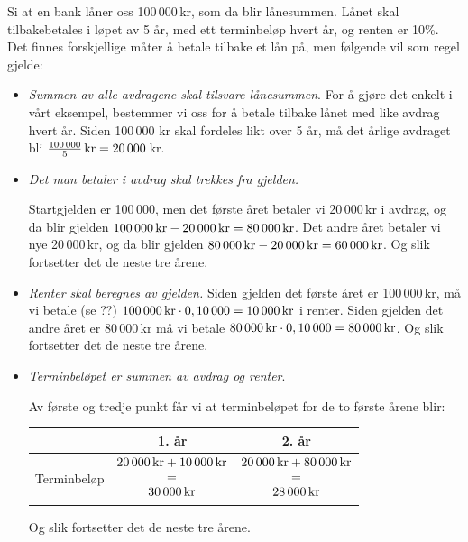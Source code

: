 Si at en bank låner  oss 100\,000\,kr, som da blir lånesummen. Lånet skal tilbakebetales i løpet av 5 år, med ett terminbeløp hvert år, og renten er 10\%. Det finnes forskjellige måter å betale tilbake et lån på, men følgende vil som regel gjelde:
\begin{itemize}
	\item \textsl{Summen av alle avdragene skal tilsvare lånesummen}.\os
	 For å gjøre det enkelt i vårt eksempel, bestemmer vi oss for å betale tilbake lånet med like avdrag hvert år. Siden 100\,000 kr skal fordeles likt over 5 år, må det årlige avdraget bli $ \frac{100\,000}{5}\,\textrm{kr}=20\,000 $\,kr.
	\item \textsl{Det man betaler i avdrag skal trekkes fra gjelden.}\os
	
	Startgjelden er 100\,000, men det første året betaler vi 20\,000\,kr i avdrag, og da blir gjelden $100\,000\,\textrm{kr}-20\,000\,\textrm{kr} =80\,000\,\textrm{kr} $. Det andre året betaler vi nye 20\,000\,kr, og da blir gjelden $ 80\,000\,\textrm{kr}-20\,000\,\textrm{kr} =60\,000\,\textrm{kr}  $. Og slik fortsetter det de neste tre årene.
	\item \textsl{Renter skal beregnes av gjelden.}\os 
	Siden gjelden det første året er 100\,000\,kr, må vi betale (se ??) ${ 100\,000\,\textrm{kr}\cdot0,10\,000=10\,000\,\textrm{kr} } $ i renter. Siden gjelden det andre året er 80\,000\,kr må vi betale ${ 80\,000\,\textrm{kr}\cdot0,10\,000=80\,000\,\textrm{kr} } $.  Og slik fortsetter det de neste tre årene.
	
	\item \textsl{Terminbeløpet er summen av avdrag og renter}.\os
	
	Av første og tredje punkt får vi at terminbeløpet for de to første årene blir:\os
	\centering
	\begin{tabular}{c| c |c}
		 & 1. år & 2. år \\ \hline
		Terminbeløp 
			& $\begin{matrix}
			20\,000\,\textrm{kr} +10\,000\,\textrm{kr}\\
			= \\
			30\,000\,\textrm{kr}
			\end{matrix} $  
				& $\begin{matrix}
					20\,000\,\textrm{kr} +80\,000\,\textrm{kr}\\
					= \\
					28\,000\,\textrm{kr}
					\end{matrix} $ 
	\end{tabular}\os
\raggedright 
Og slik fortsetter det de neste tre årene.
\end{itemize}\vsk
